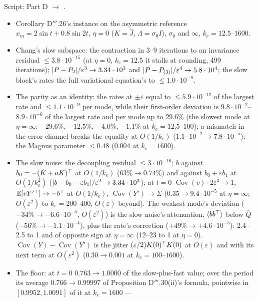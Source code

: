 Script:  Part D $\to$ .
\begin{itemize}
  \item Corollary D$'''$.26's instance on the asymmetric reference $x_m=2\sin t+0.8\sin2t$, $\eta=0$ ($K=\hat J$,
    $\Lambda=\sigma_0I$), $\sigma_0$ and $\infty$, $k_e=12.5$--$1600$.
  \item Chang's slow subspace: the contraction in 3--9 iterations to an invariance residual $\le3.8\cdot10^{-15}$ (at
    $\eta=0$, $k_e=12.5$ it stalls at rounding, 499 iterations); $\lvert P-P_2\rvert/\varepsilon^3\to3.34\cdot10^3$ and
    $\lvert P-P_{(3)}\rvert/\varepsilon^4\to5.8\cdot10^4$; the slow block's rates the full variational equation's to
    $\le1.0\cdot10^{-8}$.
  \item The parity as an identity: the rates at $\pm\varepsilon$ equal to $\le5.9\cdot10^{-12}$ of the largest rate and
    $\le1.1\cdot10^{-9}$ per mode, while their first-order deviation is $9.8\cdot10^{-2}$--$8.9\cdot10^{-6}$ of the
    largest rate and per mode up to 29.6\% (the slowest mode at $\eta=\infty$: $-29.6\%$, $-12.5\%$, $-4.0\%$,
    $-1.1\%$ at $k_e=12.5$--$100$); a mismatch in the error channel breaks the equality at $O(1/k_e)$
    ($1.1\cdot10^{-2}\to7.8\cdot10^{-5}$); the Magnus parameter $\le0.48$ (0.004 at $k_e=1600$).
  \item The slow noise: the decoupling residual $\le3\cdot10^{-16}$; $b$ against $b_0=-(\dot K+aK)^\top$ at $O(1/k_e)$
    ($63\%\to0.74\%$) and against $b_0+\varepsilon b_1$ at $O(1/k_e^2)$
    ($\lvert b-b_0-\varepsilon b_1\rvert/\varepsilon^2\to3.34\cdot10^3$); at $t=0$
    $\operatorname{Cov}(v)\cdot2\varepsilon^3\to1$, $\mathbb{E}[vY'^\top]\to-b^\top$ at $O(1/k_e)$,
    $\operatorname{Cov}(Y')\to\bar\Sigma$ ($0.35\to9.4\cdot10^{-5}$ at $\eta=\infty$; $O(\varepsilon^2)$ to
    $k_e=200$--$400$, $O(\varepsilon)$ beyond). The weakest mode's deviation ($-34\%\to-6.6\cdot10^{-5}$,
    $O(\varepsilon^2)$) is the slow noise's attenuation, $\langle bb^\top\rangle$ below $\bar Q$
    ($-56\%\to-1.1\cdot10^{-4}$), plus the rate's correction ($+49\%\to+4.6\cdot10^{-5}$): 2.4--2.5 to 1 and of
    opposite sign at $\eta=\infty$ (12--23 to 1 at $\eta=0$). $\operatorname{Cov}(Y)-\operatorname{Cov}(Y')$ is the
    jitter $(\varepsilon/2)K(0)^\top K(0)$ at $O(\varepsilon)$ and with its next term at $O(\varepsilon^2)$
    ($0.30\to0.001$ at $k_e=100$--$1600$).
  \item The floor: at $t=0$ $0.763\to1.0000$ of the slow-plus-fast value; over the period its average
    $0.766\to0.99997$ of Proposition D$'''$.30(ii)'s formula, pointwise in $[0.9952,1.0091]$ of it at $k_e=1600$ ---

\end{itemize}
